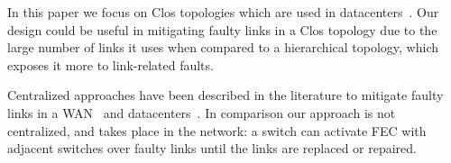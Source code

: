 
In this paper we focus on Clos topologies which are used in
datacenters~\cite{Singh:2016:JRD:2991470.2975159}.
Our design could be useful in mitigating faulty links in a
Clos topology due to the large number of links it uses when compared to a
hierarchical topology, which exposes it more to link-related faults.

Centralized approaches have been described in the literature to mitigate
faulty links in a WAN~\cite{traffic-engineering-with-forward-fault-correction}
and datacenters~\cite{Zhuo:2017:UMP:3098822.3098849}. In comparison our approach
is not centralized, and takes place in the network: a switch can activate
FEC with adjacent switches over faulty links until the links are replaced or
repaired.
